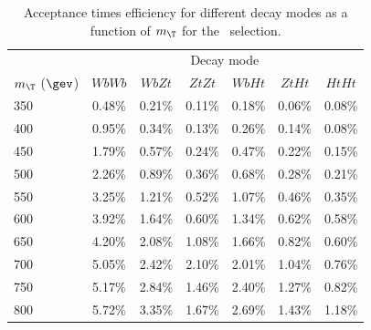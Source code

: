 \begin{table}[htb]
\begin{center}
\begin{tabular}{l c c c c c c}
\toprule
 & \multicolumn{6}{c}{Decay mode} \\
$m_{\T}$ ($\gev$) & $WbWb$ & $WbZt$ & $ZtZt$ & $WbHt$ & $ZtHt$ & $HtHt$ \\
\midrule
350 & 0.48\% & 0.21\% & 0.11\% & 0.18\% & 0.06\% & 0.08\% \\
400 & 0.95\% & 0.34\% & 0.13\% & 0.26\% & 0.14\% & 0.08\% \\
450 & 1.79\% & 0.57\% & 0.24\% & 0.47\% & 0.22\% & 0.15\% \\
500 & 2.26\% & 0.89\% & 0.36\% & 0.68\% & 0.28\% & 0.21\% \\
550 & 3.25\% & 1.21\% & 0.52\% & 1.07\% & 0.46\% & 0.35\% \\
600 & 3.92\% & 1.64\% & 0.60\% & 1.34\% & 0.62\% & 0.58\% \\
650 & 4.20\% & 2.08\% & 1.08\% & 1.66\% & 0.82\% & 0.60\% \\
700 & 5.05\% & 2.42\% & 2.10\% & 2.01\% & 1.04\% & 0.76\% \\
750 & 5.17\% & 2.84\% & 1.46\% & 2.40\% & 1.27\% & 0.82\% \\
800 & 5.72\% & 3.35\% & 1.67\% & 2.69\% & 1.43\% & 1.18\% \\
\bottomrule
\end{tabular}
\caption{Acceptance times efficiency for different \TTbar decay modes as a function of $m_{\T}$ for the \loose\ selection.}
\label{tab:eff_loose}
\end{center}
\end{table}

